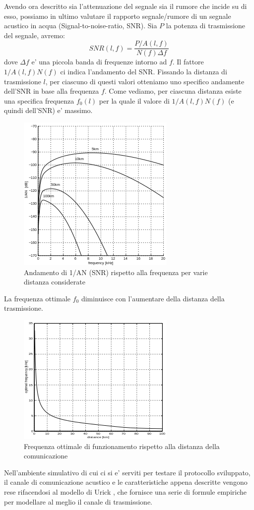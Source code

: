 Avendo ora descritto sia l'attenuazione del segnale sia il rumore che incide su di esso, possiamo in ultimo valutare il rapporto segnale/rumore di un segnale acustico in acqua (Signal-to-noise-ratio, SNR).
Sia $P$ la potenza di trasmissione del segnale, avremo:
\[SNR(l, f) = \frac{P/A(l, f)}{N(f)\Delta f}\]
dove $\Delta f $ e' una piccola banda di frequenze intorno ad $f$. Il fattore $1/A(l, f)N(f)$ ci indica l'andamento del SNR. Fissando la distanza di trasmissione $l$, per ciascuno di questi valori otteniamo uno specifico andamente dell'SNR in base alla frequenza $f$. Come vediamo, per ciascuna distanza esiste una specifica frequenza $f_0(l)$ per la quale il valore di $1/A(l, f)N(f)$ (e quindi dell'SNR) e' massimo.
\begin{figure}[H]
\centering
    \includegraphics[]{snr.png}
    \caption{Andamento di 1/AN (SNR) rispetto alla frequenza per varie distanza considerate}
\end{figure}

La frequenza ottimale $f_0$ diminuisce con l'aumentare della distanza della trasmissione.
\begin{figure}[H]
    \centering
    \includegraphics[]{optimalfreq.png}
    \caption{Frequenza ottimale di funzionamento rispetto alla distanza della comunicazione}
\end{figure}
\par
Nell'ambiente simulativo di cui ci si e' serviti per testare il protocollo sviluppato, il canale di comunicazione acustico e le caratteristiche appena descritte vengono rese rifacendosi al modello di Urick \cite{urick}, che fornisce una serie di formule empiriche per modellare al meglio il canale di trasmissione.

